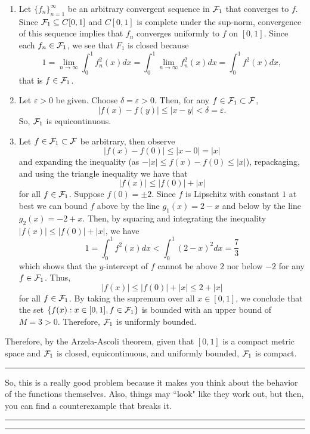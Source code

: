 \documentclass{article}
\begin{document}
\begin{enumerate}
	\item Let $\{f_n\}_{n=1}^\infty$ be an arbitrary convergent sequence in $\mathcal F_1$ that converges to $f$. Since 
		$\mathcal F_1\subseteq C[0,1]$ and $C[0,1]$ is complete under the sup-norm, convergence of this sequence 
		implies that $f_n$ converges uniformly to $f$ on $[0,1]$. Since each $f_n\in \mathcal F_1$, we see that $F_1$ is
		 closed because
			\[ 1 = \lim_{n\to\infty} \int_0^1 f_n^2(x) dx = \int_0^1 \lim_{n\to\infty} f_n^2(x) dx = \int_0^1 f^2(x) dx,\]
		that is $f\in \mathcal F_1$. 
	\item Let $\varepsilon>0$ be given. Choose $\delta = \varepsilon > 0$. Then, for any $f\in \mathcal F_1 \subset \mathcal F$, 
		\[ |f(x) - f(y)| \leq |x-y| < \delta = \varepsilon.\]
		So, $\mathcal F_1$ is equicontinuous.
		
	\item Let $f\in \mathcal F_1\subset \mathcal F$ be arbitrary, then observe
			\[ |f(x) - f(0)| \leq |x-0| = |x|\]
		and expanding the inequality (as $-|x| \leq f(x) - f(0) \leq |x|$), repackaging, and using the triangle inequality
		 we have that 
			\[|f(x)| \leq |f(0)| + |x|\]
		for all $f\in \mathcal F_1$. Suppose $f(0) = \pm 2$. Since $f$ is Lipschitz with constant $1$ at best we can bound $f$
		above by the line $g_1(x) = 2-x$ and below by the line $g_2(x) = -2+x$. Then, by squaring and integrating 
		the inequality $|f(x)| \leq |f(0)| + |x|$, we have
		 	\[ 1 = \int_0^1 f^2(x) dx < \int_0^1(2-x)^2 dx = \frac{7}{3}\]
		which shows that the $y$-intercept of $f$ cannot be above $2$ nor below $-2$ for any $f\in \mathcal F_1$.
		Thus, 
			\[|f(x)| \leq |f(0)| + |x| \leq 2 + |x|\]
		for all $f\in \mathcal F_1$. By taking the supremum over all $x\in [0,1]$, we conclude that the set
		 $\{f(x) : x\in [0,1], f\in\mathcal F_1\}$ is bounded with an upper bound of $M = 3 > 0$. Therefore, $\mathcal F_1$ is uniformly bounded.
\end{enumerate}
	
	Therefore, by the Arzela-Ascoli theorem, given that $[0,1]$ is a compact metric space and $\mathcal F_1$ is closed, 
	equicontinuous, and uniformly bounded, $\mathcal F_1$ is compact. \\
	
\hrule

So, this is a really good problem because it makes you think about the behavior of the functions themselves. Also, things may ``look" like they work out, but then, you can find a counterexample that breaks it. \\

\hrule \vspace{2pt}
\hrule
\end{document}
